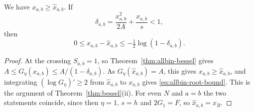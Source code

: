 \begin{corollary}\label{cor:allbin-root-bound}
We have $x_{a,b}\ge \hat x_{a,b}$. If
\[
 \delta_{a,b}=\frac{x_{a,b}^2}{2A}+\frac{x_{a,b}}s<1,
\]
then
\begin{equation}\label{eq:allbin-root-bound}
 0\le x_{a,b}-\hat x_{a,b}\le-\tfrac12\log(1-\delta_{a,b}).
\end{equation}
\end{corollary}

\begin{proof}
At
the crossing $S_{a,b}=1$, so Theorem~\ref{thm:allbin-bessel} gives
$A\le G_\eta(x_{a,b})\le A/(1-\delta_{a,b})$. As $G_\eta(\hat x_{a,b})=A$, this gives
$x_{a,b}\ge \hat x_{a,b}$, and integrating $(\log G_\eta)'\ge2$ from $\hat x_{a,b}$ to
$x_{a,b}$ gives \eqref{eq:allbin-root-bound}. This is the argument of
Theorem~\ref{thm:bessel}(ii). For even $N$ and $a=b$ the two statements
coincide, since then $\eta=1$, $s=h$ and $2G_1=F$, so $\hat x_{a,b}=x_B$.
\end{proof}

